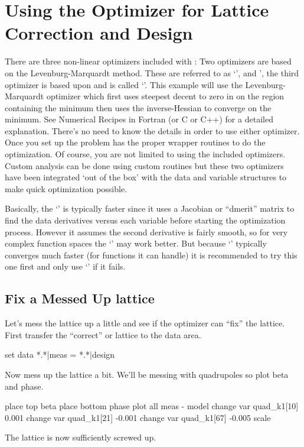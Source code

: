 \section{Using the Optimizer for Lattice Correction and Design}
\label{s:optimizer}

There are three non-linear optimizers included with \tao: Two
optimizers are based on the Levenburg-Marquardt method. These are
referred to as `', and ', the third optimizer is
based upon  and is called `'. This example
will use the Levenburg-Marquardt optimizer which first uses steepest
decent to zero in on the region containing the minimum then uses the
inverse-Hessian to converge on the minimum. See Numerical Recipes in
Fortran (or C or C++) for a detailed explanation. There's no need to
know the details in order to use either optimizer. Once you set up the
problem \tao has the proper wrapper routines to do the
optimization. Of course, you are not limited to using the included
optimizers. Custom analysis can be done using custom routines but
these two optimizers have been integrated `out of the box' with the
\tao data and variable structures to make quick optimization possible.

Basically, the `' is typically faster since it uses a Jacobian
or ``dmerit'' matrix to find the data derivatives versus each variable
before starting the optimization process.  However it assumes the
second derivative is fairly smooth, so for very complex function
spaces the `' may work better. But because `' typically
converges much faster (for functions it can handle) it is recommended
to try this one first and only use `' if it fails.

\subsection{Fix a Messed Up lattice}
\label{ss:fix_it}

Let's mess the lattice up a little and see if the optimizer can
``fix'' the lattice. First transfer the ``correct'' or 
lattice to the  data area.
\begin{example}
  set data *.*|meas = *.*|design
\end{example}
Now mess up the lattice a bit. We'll be messing with quadrupoles so
plot beta and phase.
\begin{example}
  place top beta
  place bottom phase
  plot all meas - model
  change var quad\_k1[10] 0.001
  change var quad\_k1[21] -0.001
  change var quad\_k1[67] -0.005
  scale
\end{example}
The lattice is now sufficiently screwed up.

